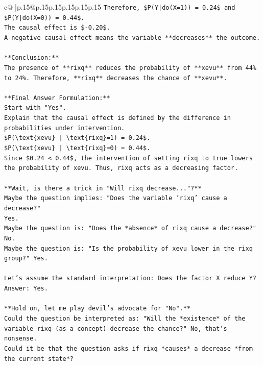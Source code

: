 \documentclass{article}
\begin{document}
{\begin{supertabular}{c@{$\;$}|p{.15\linewidth}@{}p{.15\linewidth}p{.15\linewidth}p{.15\linewidth}p{.15\linewidth}p{.15\linewidth}}
{{{\texttt{Therefore, \$P(Y|do(X=1)) = 0.24\$ and \$P(Y|do(X=0)) = 0.44\$.} \\
\texttt{The causal effect is \${-}0.20\$.} \\
\texttt{A negative causal effect means the variable **decreases** the outcome.} \\
\\ 
\texttt{**Conclusion:**} \\
\texttt{The presence of **rixq** reduces the probability of **xevu** from 44\% to 24\%. Therefore, **rixq** decreases the chance of **xevu**.} \\
\\ 
\texttt{**Final Answer Formulation:**} \\
\texttt{Start with "Yes".} \\
\texttt{Explain that the causal effect is defined by the difference in probabilities under intervention.} \\
\texttt{\$P(\textbackslash{}text\{xevu\} | \textbackslash{}text\{rixq\}=1) = 0.24\$.} \\
\texttt{\$P(\textbackslash{}text\{xevu\} | \textbackslash{}text\{rixq\}=0) = 0.44\$.} \\
\texttt{Since \$0.24 < 0.44\$, the intervention of setting rixq to true lowers the probability of xevu. Thus, rixq acts as a decreasing factor.} \\
\\ 
\texttt{**Wait, is there a trick in "Will rixq decrease..."?**} \\
\texttt{Maybe the question implies: "Does the variable 'rixq' cause a decrease?"} \\
\texttt{Yes.} \\
\texttt{Maybe the question is: "Does the *absence* of rixq cause a decrease?" No.} \\
\texttt{Maybe the question is: "Is the probability of xevu lower in the rixq group?" Yes.} \\
\\ 
\texttt{Let's assume the standard interpretation: Does the factor X reduce Y?} \\
\texttt{Answer: Yes.} \\
\\ 
\texttt{**Hold on, let me play devil's advocate for "No".**} \\
\texttt{Could the question be interpreted as: "Will the *existence* of the variable rixq (as a concept) decrease the chance?" No, that's nonsense.} \\
\texttt{Could it be that the question asks if rixq *causes* a decrease *from the current state*?} \\
}}}
\end{supertabular}}
\end{document}
